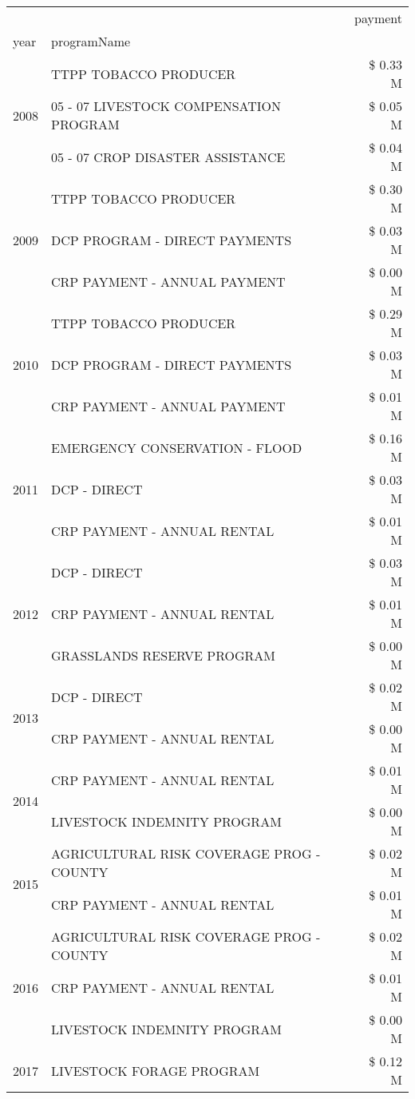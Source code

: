 \begin{tabular}{llr}
\toprule
 &  & payment \\
year & programName &  \\
\midrule
\multirow[t]{3}{*}{2008} & TTPP TOBACCO PRODUCER & \$ 0.33 M \\
 & 05 - 07 LIVESTOCK COMPENSATION PROGRAM & \$ 0.05 M \\
 & 05 - 07 CROP DISASTER ASSISTANCE & \$ 0.04 M \\
\cline{1-3}
\multirow[t]{3}{*}{2009} & TTPP TOBACCO PRODUCER & \$ 0.30 M \\
 & DCP PROGRAM - DIRECT PAYMENTS & \$ 0.03 M \\
 & CRP PAYMENT - ANNUAL PAYMENT & \$ 0.00 M \\
\cline{1-3}
\multirow[t]{3}{*}{2010} & TTPP TOBACCO PRODUCER & \$ 0.29 M \\
 & DCP PROGRAM - DIRECT PAYMENTS & \$ 0.03 M \\
 & CRP PAYMENT - ANNUAL PAYMENT & \$ 0.01 M \\
\cline{1-3}
\multirow[t]{3}{*}{2011} & EMERGENCY CONSERVATION - FLOOD & \$ 0.16 M \\
 & DCP - DIRECT & \$ 0.03 M \\
 & CRP PAYMENT - ANNUAL RENTAL & \$ 0.01 M \\
\cline{1-3}
\multirow[t]{3}{*}{2012} & DCP - DIRECT & \$ 0.03 M \\
 & CRP PAYMENT - ANNUAL RENTAL & \$ 0.01 M \\
 & GRASSLANDS RESERVE PROGRAM & \$ 0.00 M \\
\cline{1-3}
\multirow[t]{2}{*}{2013} & DCP - DIRECT & \$ 0.02 M \\
 & CRP PAYMENT - ANNUAL RENTAL & \$ 0.00 M \\
\cline{1-3}
\multirow[t]{2}{*}{2014} & CRP PAYMENT - ANNUAL RENTAL & \$ 0.01 M \\
 & LIVESTOCK INDEMNITY PROGRAM & \$ 0.00 M \\
\cline{1-3}
\multirow[t]{2}{*}{2015} & AGRICULTURAL RISK COVERAGE PROG - COUNTY & \$ 0.02 M \\
 & CRP PAYMENT - ANNUAL RENTAL & \$ 0.01 M \\
\cline{1-3}
\multirow[t]{3}{*}{2016} & AGRICULTURAL RISK COVERAGE PROG - COUNTY & \$ 0.02 M \\
 & CRP PAYMENT - ANNUAL RENTAL & \$ 0.01 M \\
 & LIVESTOCK INDEMNITY PROGRAM & \$ 0.00 M \\
\cline{1-3}
\multirow[t]{3}{*}{2017} & LIVESTOCK FORAGE PROGRAM & \$ 0.12 M \\

\end{tabular}
